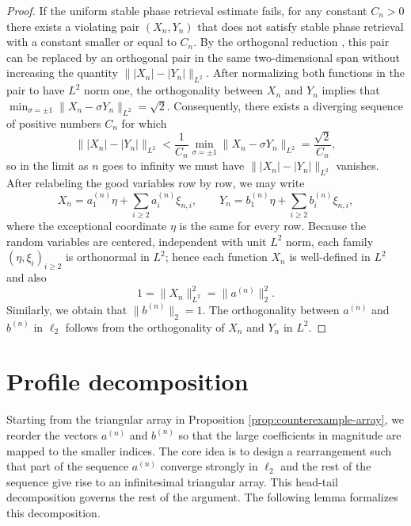 \documentclass[11pt]{amsart}
\begin{document}
\begin{proof}
If the uniform stable phase retrieval estimate fails, for any constant $C_n>0$ there exists a violating pair $(X_n,Y_n)$ that does not satisfy stable phase retrieval with a constant smaller or equal to $C_n$. By the orthogonal reduction
\cite[Theorem~3.9]{FOTP}, this pair can be replaced by an orthogonal pair
in the same two-dimensional span without increasing the quantity
$\bigl\| |X_n|-|Y_n| \bigr\|_{L^2}$. After normalizing both functions in the pair to have
$L^2$ norm one, the orthogonality between $X_n$ and $Y_n$ implies that
$\min_{\sigma=\pm 1}\|X_n-\sigma Y_n\|_{L^2}=\sqrt{2}$. Consequently, there exists a diverging sequence of positive numbers  $C_n$ for which
\begin{equation*}
\bigl\| |X_n|-|Y_n| \bigr\|_{L^2}< \frac{1}{C_n}\min_{\sigma=\pm 1}\|X_n-\sigma Y_n\|_{L^2} = \frac{\sqrt{2}}{C_n},
\end{equation*}
so in the limit as $n$ goes to infinity we must have $\bigl\| |X_n|-|Y_n| \bigr\|_{L^2}$ vanishes. After relabeling the good
variables row by row, we may write
\[
X_n = a_1^{(n)}\eta + \sum_{i \ge 2} a_i^{(n)} \xi_{n,i},
\qquad
Y_n = b_1^{(n)}\eta + \sum_{i \ge 2} b_i^{(n)} \xi_{n,i},
\]
where the exceptional coordinate $\eta$ is the same for every row. Because the random variables are centered, independent with unit $L^2$ norm, each
family $(\eta,\xi_i)_{i \ge 2}$ is orthonormal in $L^2$; hence each function $X_n$ is well-defined in $L^2$ and also
\begin{equation*}
    1= \|X_n\|_{L^2}^2 = \|a^{(n)}\|_2^2.
\end{equation*}
Similarly, we obtain that $\|b^{(n)}\|_2=1$. The orthogonality between $a^{(n)}$ and $b^{(n)}$ in $\ell_2$ follows from the orthogonality of $X_n$ and $Y_n$ in $L^2$. 
\end{proof}

\section{Profile decomposition}
Starting from the triangular array in Proposition \ref{prop:counterexample-array}, we reorder the vectors $a^{(n)}$ and $b^{(n)}$  so that the large coefficients in magnitude are mapped to the smaller indices. The core idea is to design a rearrangement such that part of the sequence $a^{(n)}$ converge strongly in $\ell_2$ and the rest of the sequence give rise to an infinitesimal triangular array. This 
head-tail decomposition governs the rest of the argument. The following lemma formalizes this decomposition.
\end{document}
